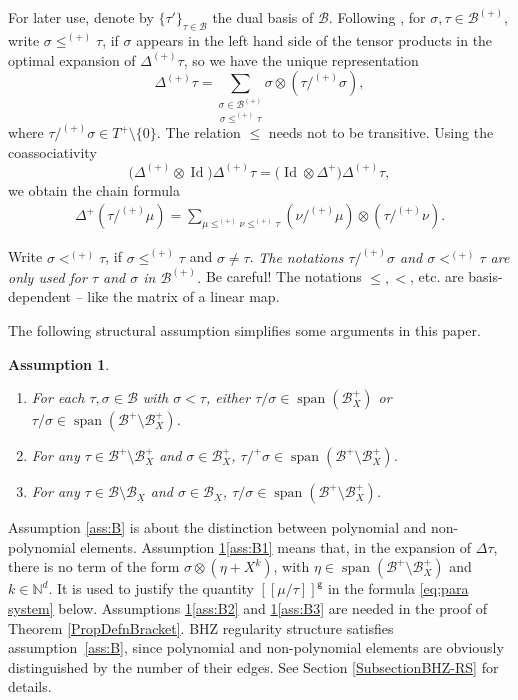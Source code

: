 \documentclass[JEP,XML,SOM,Unicode,published]{cedram}
\DeclareMathOperator{\Span}{span}
\theoremstyle{plain}
\newtheorem{assumption}{Assumption}
\theoremstyle{definition}
\DeclareMathOperator{\iden}{Id}
\newcommand{\Brac}[1]{[\![#1]\!]}
\newcommand{\sfg}{\mathsf{g}}
\newcommand{\bbN}{\mathbb{N}}
\newcommand{\mcB}{\mathcal{B}}
\begin{document}
For later use, denote by $\{\tau'\}_{\tau\in\mcB}$ the dual basis of $\mcB$. Following \cite{BH}, for $\sigma,\tau\in\mcB^{(+)}$, write $\sigma\le^{(+)}\tau$, if $\sigma$ appears in the left hand side of the tensor products in the optimal expansion of $\Delta^{(+)}\tau$, so we have the unique representation
\[
\Delta^{(+)}\tau = \underset{\sigma\le^{(+)}\tau}{\sum_{\sigma\in\mcB^{(+)}}} \sigma\otimes(\tau/^{(+)}\sigma),
\]
where $\tau/^{(+)}\sigma\in T^+\setminus\{0\}$.
The relation $\le$ needs not to be transitive. Using the coassociativity
\[
\bigl(\Delta^{(+)}\otimes\iden \bigr)\Delta^{(+)}\tau = \bigl(\iden \otimes\Delta^+\bigr)\Delta^{(+)}\tau,
\]
we obtain the chain formula
\begin{align}\label{chain formula}
\Delta^{+}(\tau/^{(+)}\mu)=\sum_{\mu\le^{(+)}\nu\le^{(+)}\tau}(\nu/^{(+)}\mu)\otimes(\tau/^{(+)}\nu).
\end{align}

Write $\sigma<^{(+)}\tau$, if $\sigma\le^{(+)}\tau$ and $\sigma\neq\tau$.
{\it The notations $\tau/^{(+)}\sigma$ and $\sigma<^{(+)}\tau$ are only used for $\tau$ and $\sigma$ in $\mcB^{(+)}$.} Be careful! The notations $\leq, <$, etc. are basis-dependent -- like the matrix of a linear map.

The following structural assumption simplifies some arguments in this paper.

\skpt
\begin{assumption}\label{ass:B}
\begin{enumerate}
\item\label{ass:B1} For each $\tau,\sigma\in\mcB$ with $\sigma<\tau$, either $\tau/\sigma\in\Span (\mcB_X^+)$ or $\tau/\sigma\in\Span (\mcB^+\setminus\mcB_X^+)$.
\item\label{ass:B2} For any $\tau\in\mcB^+\setminus\mcB_X^+$ and $\sigma\in\mcB_X^+$, $\tau/^+\sigma\in\Span (\mcB^+\setminus\mcB_X^+)$.
\item\label{ass:B3} For any $\tau\in\mcB\setminus\mcB_{\underline{X}}$ and $\sigma\in\mcB_{\underline{X}}$, $\tau/\sigma\in\Span (\mcB^+\setminus\mcB_X^+)$.
\end{enumerate}
\end{assumption}

Assumption \eqref{ass:B} is about the distinction between polynomial and non-polynomial elements.
Assumption \ref{ass:B}\eqref{ass:B1} means that, in the expansion of $\Delta\tau$, there is no term of the form $\sigma\otimes (\eta+X^k)$, with $\eta\in\Span (\mcB^+\setminus\mcB_X^+)$ and $k\in\bbN^d$. It is used to justify the quantity $\Brac{\mu/\tau}^{\sfg}$ in the formula \eqref{eq:para system} below.
Assumptions \ref{ass:B}\eqref{ass:B2} and \ref{ass:B}\eqref{ass:B3} are needed in the proof of Theorem \ref{PropDefnBracket}.
BHZ regularity structure satisfies assumption~\eqref{ass:B}, since polynomial and non-polynomial elements are obviously distinguished by the number of their edges. See Section \ref{SubsectionBHZ-RS} for details.
\end{document}
